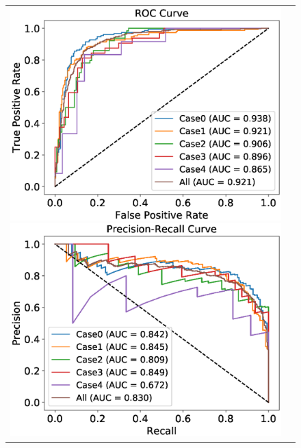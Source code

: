 \documentclass[useamsfonts]{pasj01}
\begin{document}
%
%
%
\begin{figure}[htbp]
    \begin{tabular}{cc}
        \begin{minipage}{0.5\hsize}
            \begin{center}
                \includegraphics[width=\columnwidth]{figures/10_abs-mag_scaled-flux_w-mixup_remove-y_predictions_test_ROC_all.eps}
            \end{center}
        \end{minipage}
        \begin{minipage}{0.5\hsize}
            \begin{center}
                \includegraphics[width=\columnwidth]{figures/10_abs-mag_scaled-flux_w-mixup_remove-y_predictions_test_PreRec_all.eps}

\end{center}
\end{minipage}
\end{tabular}
\end{figure}
\end{document}
